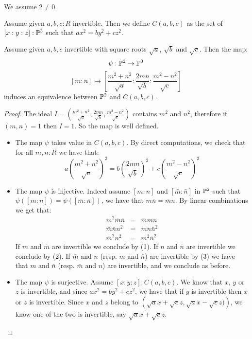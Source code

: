 We assume $2\not=0$.

\begin{definition}
Assume given $a,b,c:R$ invertible. Then we define $C(a,b,c)$ as the set of $[x:y:z]:\mathbb{P}^3$ such that $ax^2=by^2+cz^2$.
\end{definition}

\begin{lemma}\label{severi-example-with-roots}
Assume given $a,b,c$ invertible with square roots $\sqrt{a}$, $\sqrt{b}$ and $\sqrt{c}$. Then the map:
\[\psi:\mathbb{P}^2\to \mathbb{P}^3\]
\[ [m:n]\mapsto \left[\frac{m^2+n^2}{\sqrt{a}} : \frac{2mn}{\sqrt{b}} : \frac{m^2-n^2}{\sqrt{c}}\right] \]
induces an equivalence between $\mathbb{P}^2$ and $C(a,b,c)$.
\end{lemma}

\begin{proof}
The ideal $I = \left(\frac{m^2+n^2}{\sqrt{a}}, \frac{2mn}{\sqrt{b}}, \frac{m^2-n^2}{\sqrt{c}}\right)$ contains $m^2$ and $n^2$, therefore if $(m,n)=1$ then $I=1$. So the map is well defined.
\begin{itemize}

\item The map $\psi$ takes value in $C(a,b,c)$. By direct computations, we check that for all $m,n:R$ we have that:
\[a\left(\frac{m^2+n^2}{\sqrt{a}}\right)^2 = b\left(\frac{2mn}{\sqrt{b}}\right)^2 + c\left(\frac{m^2-n^2}{\sqrt{c}}\right)^2\]

\item The map $\psi$ is injective. Indeed assume $[m:n]$ and $[\bar{m}:\bar{n}]$ in $\mathbb{P}^2$ such that $\psi([m:n])=\psi([\bar{m}:\bar{n}])$, we have that $m\bar{n}=\bar{m}n$. By linear combinations we get that:
\begin{eqnarray}
m^2\bar{m}\bar{n} &=& \bar{m}mn\\
\bar{m}\bar{n}n^2 &=& mn\bar{n}^2\\
\bar{m}^2n^2 &=& m^2\bar{n}^2
\end{eqnarray}
If $m$ and $\bar{m}$ are invertible we conclude by (1). If $n$ and $\bar{n}$ are invertible we conclude by (2). If $\bar{m}$ and $n$ (resp. $m$ and $\bar{n}$) are invertible by (3) we have that $m$ and $\bar{n}$ (resp. $\bar{m}$ and $n$) are invertible, and we conclude as before.

\item The map $\psi$ is surjective. Assume $[x:y:z]:C(a,b,c)$. We know that $x$, $y$ or $z$ is invertible, and since $ax^2=by^2+cz^2$, we have that if $y$ is invertible then $x$ or $z$ is invertible. Since $x$ and $z$ belong to $\left(\sqrt{a}x+\sqrt{c}z, \sqrt{a}x-\sqrt{c}z)\right)$, we know one of the two is invertible, say $\sqrt{a}x+\sqrt{c}z$. 


\end{itemize}
\end{proof}
